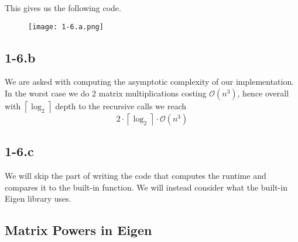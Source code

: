 \documentclass{article}
\begin{document}
\pagebreak 

\noindent This gives us the following code.

\begin{figure}[!hbt]
    \centering
\texttt{[image: 1-6.a.png]}
\end{figure}

\subsection*{1-6.b}
We are asked with computing the asymptotic complexity of our implementation. In the worst case we do $2$ matrix multiplications costing $\mathcal{O}\left(n^{3}\right)$, hence overall with $\left\lceil \log_{2}\right\rceil$ depth to the recursive calls we reach 
\begin{equation*}
    2 \cdot \left\lceil \log_{2}\right\rceil \cdot \mathcal{O}\left(n^{3}\right)
\end{equation*}
\subsection*{1-6.c}
We will skip the part of writing the code that computes the runtime and compares it to the built-in function. We will instead consider what the built-in Eigen library uses.

\subsection*{Matrix Powers in Eigen}
\end{document}
